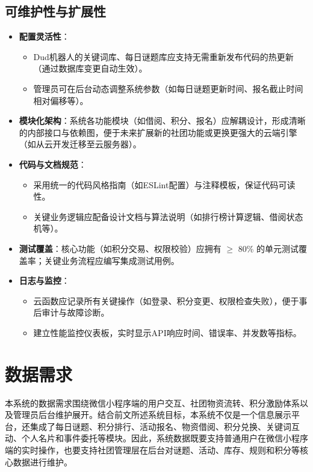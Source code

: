 \documentclass[a4paper,12pt]{article}
\begin{document}
\subsection{可维护性与扩展性}
\begin{itemize}
    \item \textbf{配置灵活性}：
        \begin{itemize}
            \item Dud机器人的关键词库、每日谜题库应支持无需重新发布代码的热更新（通过数据库变更自动生效）。
            \item 管理员可在后台动态调整系统参数（如每日谜题更新时间、报名截止时间相对偏移等）。
        \end{itemize}
    \item \textbf{模块化架构}：系统各功能模块（如借阅、积分、报名）应解耦设计，形成清晰的内部接口与依赖图，便于未来扩展新的社团功能或更换更强大的云端引擎（如从云开发迁移至云服务器）。
    \item \textbf{代码与文档规范}：
        \begin{itemize}
            \item 采用统一的代码风格指南（如ESLint配置）与注释模板，保证代码可读性。
            \item 关键业务逻辑应配备设计文档与算法说明（如排行榜计算逻辑、借阅状态机等）。
        \end{itemize}
    \item \textbf{测试覆盖}：核心功能（如积分交易、权限校验）应拥有 $\geq$ 80\% 的单元测试覆盖率；关键业务流程应编写集成测试用例。
    \item \textbf{日志与监控}：
        \begin{itemize}
            \item 云函数应记录所有关键操作（如登录、积分变更、权限检查失败），便于事后审计与故障诊断。
            \item 建立性能监控仪表板，实时显示API响应时间、错误率、并发数等指标。
        \end{itemize}
\end{itemize}

\section{数据需求}

本系统的数据需求围绕微信小程序端的用户交互、社团物资流转、积分激励体系以及管理员后台维护展开。结合前文所述系统目标，本系统不仅是一个信息展示平台，还集成了每日谜题、积分排行、活动报名、物资借阅、积分兑换、关键词互动、个人名片和事件委托等模块。因此，系统数据既要支持普通用户在微信小程序端的实时操作，也要支持社团管理层在后台对谜题、活动、库存、规则和积分等核心数据进行维护。
\end{document}
